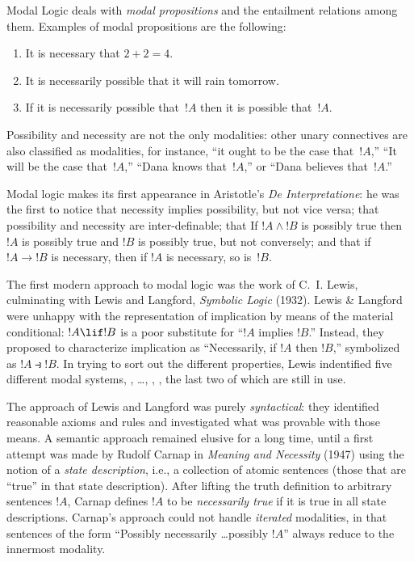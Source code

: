 \documentclass[../../../include/open-logic-section]{subfiles}
\begin{document}


Modal Logic deals with \emph{modal propositions} and the entailment
relations among them. Examples of modal propositions are the
following:
\begin{enumerate}
\item It is necessary that $2+2=4$.
\item It is necessarily possible that it will rain tomorrow.
\item If it is necessarily possible that~$!A$ then it is possible
  that~$!A$.
\end{enumerate}
Possibility and necessity are not the only modalities: other unary
connectives are also classified as modalities, for instance, ``it
ought to be the case that~$!A$,'' ``It will be the case that~$!A$,''
``Dana knows that~$!A$,'' or ``Dana believes that~$!A$.''

Modal logic makes its first appearance in Aristotle's \emph{De
  Interpretatione}: he was the first to notice that necessity implies
possibility, but not vice versa; that possibility and necessity are
inter-definable; that If $!A \land !B$ is possibly true then
$!A$ is possibly true and $!B$ is possibly true, but not
conversely; and that if $!A \to !B$ is necessary, then if
$!A$ is necessary, so is~$!B$.

The first modern approach to modal logic was the work of C.~I. Lewis,
culminating with Lewis and Langford, \emph{Symbolic Logic}
(1932). Lewis \& Langford were unhappy with the representation of
implication by means of the material conditional: $!A \lif !B$
is a poor substitute for ``$!A$ implies $!B$.'' Instead, they
proposed to characterize implication as ``Necessarily, if $!A$
then $!B$,'' symbolized as $!A \strictif !B$. In trying to
sort out the different properties, Lewis indentified five different
modal systems, , \ldots, , , the last
two of which are still in use.

The approach of Lewis and Langford was purely \emph{syntactical}: they
identified reasonable axioms and rules and investigated what was
provable with those means. A semantic approach remained elusive for a
long time, until a first attempt was made by Rudolf Carnap in
\emph{Meaning and Necessity} (1947) using the notion of a \emph{state
  description}, i.e., a collection of atomic sentences (those that are
``true'' in that state description). After lifting the truth
definition to arbitrary sentences $!A$, Carnap defines $!A$
to be \emph{necessarily true} if it is true in all state
descriptions. Carnap's approach could not handle \emph{iterated}
modalities, in that sentences of the form ``Possibly necessarily
\ldots possibly $!A$'' always reduce to the innermost modality.
\end{document}
